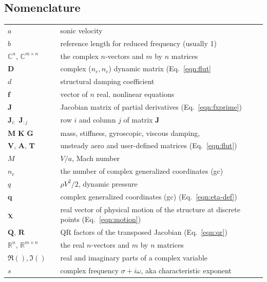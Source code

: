 \documentclass[11pt,openany,twoside]{book}
\numberwithin{equation}{section}		%
\newcommand{\Matrix}[1]{\boldsymbol{#1}}
\newcommand{\Vector}[1]{\boldsymbol{#1}}
\newcommand{\Gc}{gc}
\newcommand{\Eqn}[1]{Eq.\ \ref{#1}}  %
\begin{document}
\subsection{Nomenclature}\label{sect:nomenclature}
\noindent\begin{longtable}{@{}lcl@{}}
$a$ & & sonic velocity \\
$b$ & & reference length for reduced frequency (usually 1)\index{=b@$b$ (ref. length)} \\
$\mathbb{C}^n$, $\mathbb{C}^{m \times n}$ & & the complex $n$-vectors
   and $m$ by $n$ matrices \\
$\Matrix{D}$ & & complex ($n_e,n_e$) dynamic matrix (\Eqn{eqn:flut} \\
$d$ & & structural damping coefficient \\
$\Vector{f}$ & & vector of $n$ real, nonlinear equations \\
$\Matrix{J}$ & & Jacobian matrix of partial derivatives (\Eqn{eqn:fxprime}) \\
$\Matrix{J}_{i:}$\boldmath{,} $\Matrix{J}_{:j}$ & & row $i$
   and column $j$ of matrix $\Matrix{J}$ \\
$\Matrix{M}$\boldmath{,} $\Matrix{K}$\boldmath{,} $\Matrix{G}$\boldmath{,} &  & mass,
   stiffness, gyroscopic, viscous damping, \\
$\Matrix{V}$, $\Matrix{A}$, $\Matrix{T}$ & & unsteady aero and
   user-defined matrices (\Eqn{eqn:flut}) \\
$M$ & & $V/a$, Mach number \\
$n_e$ & & the number of complex generalized coordinates (\Gc) \\
$q$ & & $\rho V^2/2$, dynamic pressure \\
$\Vector{q}$ & & complex generalized coordinates (\Gc) (\Eqn{eqn:eta-def}) \\
$\Vector{\chi}$ & & real vector of physical motion of the structure
	at discrete points (\Eqn{eqn:motion}) \\
$\Matrix{Q}$, $\Matrix{R}$ & & QR factors of the transposed Jacobian (\Eqn{eqn:qr}) \\
$\mathbb{R}^n$, $\mathbb{R}^{m \times n}$ & & the real $n$-vectors and $m$ by $n$ matrices \\
$\Re(), \Im()$ & & real and imaginary parts of a complex variable \\
$s$ & & complex frequency $\sigma + i\omega$, aka characteristic exponent \\

\end{longtable}
\end{document}

